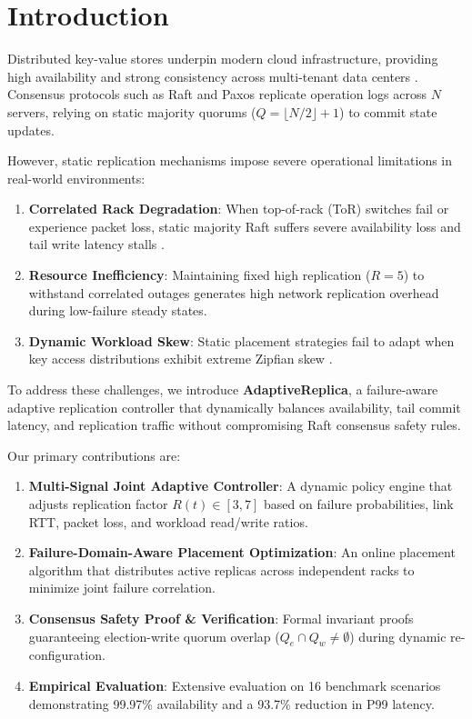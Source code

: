 \section{Introduction}
\label{sec:intro}

Distributed key-value stores underpin modern cloud infrastructure, providing high availability and strong consistency across multi-tenant data centers \cite{corbett2012spanner}. Consensus protocols such as Raft \cite{ongaro2014search} and Paxos \cite{lamport2001paxos} replicate operation logs across $N$ servers, relying on static majority quorums ($Q = \lfloor N/2 \rfloor + 1$) to commit state updates.

However, static replication mechanisms impose severe operational limitations in real-world environments:
\begin{enumerate}
    \item \textbf{Correlated Rack Degradation}: When top-of-rack (ToR) switches fail or experience packet loss, static majority Raft suffers severe availability loss and tail write latency stalls \cite{ford2010availability}.
    \item \textbf{Resource Inefficiency}: Maintaining fixed high replication ($R=5$) to withstand correlated outages generates high network replication overhead during low-failure steady states.
    \item \textbf{Dynamic Workload Skew}: Static placement strategies fail to adapt when key access distributions exhibit extreme Zipfian skew \cite{dean2013tail}.
\end{enumerate}

To address these challenges, we introduce \textbf{AdaptiveReplica}, a failure-aware adaptive replication controller that dynamically balances availability, tail commit latency, and replication traffic without compromising Raft consensus safety rules.

Our primary contributions are:
\begin{enumerate}
    \item \textbf{Multi-Signal Joint Adaptive Controller}: A dynamic policy engine that adjusts replication factor $R(t) \in [3, 7]$ based on failure probabilities, link RTT, packet loss, and workload read/write ratios.
    \item \textbf{Failure-Domain-Aware Placement Optimization}: An online placement algorithm that distributes active replicas across independent racks to minimize joint failure correlation.
    \item \textbf{Consensus Safety Proof & Verification}: Formal invariant proofs guaranteeing election-write quorum overlap ($Q_e \cap Q_w \neq \emptyset$) during dynamic re-configuration.
    \item \textbf{Empirical Evaluation}: Extensive evaluation on 16 benchmark scenarios demonstrating 99.97\% availability and a 93.7\% reduction in P99 latency.
\end{enumerate}

